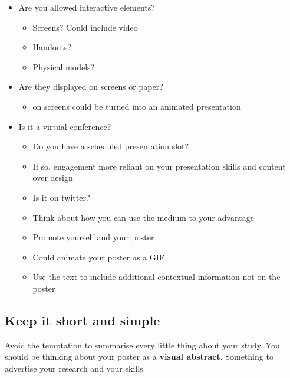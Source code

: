 \documentclass[
]{book}
\providecommand{\tightlist}{%
  \setlength{\itemsep}{0pt}\setlength{\parskip}{0pt}}
\begin{document}
\begin{itemize}
\tightlist
\item
  Are you allowed interactive elements?

  \begin{itemize}
  \tightlist
  \item
    Screens? Could include video
  \item
    Handouts?
  \item
    Physical models?
  \end{itemize}
\item
  Are they displayed on screens or paper?

  \begin{itemize}
  \tightlist
  \item
    on screens could be turned into an animated presentation
  \end{itemize}
\item
  Is it a virtual conference?

  \begin{itemize}
  \tightlist
  \item
    Do you have a scheduled presentation slot?
  \item
    If so, engagement more reliant on your presentation skills and content over design
  \item
    Is it on twitter?
  \item
    Think about how you can use the medium to your advantage
  \item
    Promote yourself and your poster
  \item
    Could animate your poster as a GIF
  \item
    Use the text to include additional contextual information not on the poster
  \end{itemize}
\end{itemize}

\hypertarget{keep-it-short-and-simple}{%
\subsection{Keep it short and simple}\label{keep-it-short-and-simple}}

Avoid the temptation to summarise every little thing about your study. You should be thinking about your poster as a \textbf{visual abstract}. Something to advertise your research and your skills.
\end{document}
